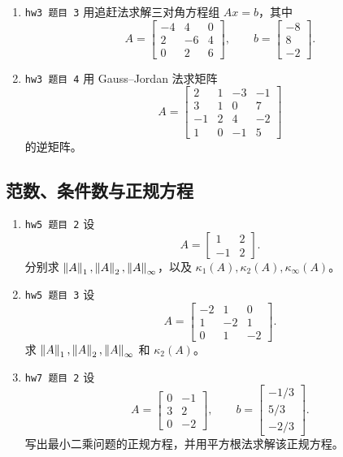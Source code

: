 \documentclass{article}
\begin{document}
\begin{enumerate}
  \item \texttt{hw3 题目 3} 用追赶法求解三对角方程组 $Ax=b$，其中
  \[
    A=
    \begin{bmatrix}
      -4&4&0\\
      2&-6&4\\
      0&2&6
    \end{bmatrix},\qquad
    b=\begin{bmatrix}-8\\8\\-2\end{bmatrix}.
  \]

  \item \texttt{hw3 题目 4} 用 Gauss--Jordan 法求矩阵
  \[
    A=
    \begin{bmatrix}
      2&1&-3&-1\\
      3&1&0&7\\
      -1&2&4&-2\\
      1&0&-1&5
    \end{bmatrix}
  \]
  的逆矩阵。
\end{enumerate}

\subsection{范数、条件数与正规方程}

\begin{enumerate}
  \item \texttt{hw5 题目 2} 设
  \[
    A=\begin{bmatrix}1&2\\-1&2\end{bmatrix}.
  \]
  分别求 $\left\| A \right\|_1,\left\| A \right\|_2,\left\| A \right\|_\infty$，以及
  $\kappa_1(A),\kappa_2(A),\kappa_\infty(A)$。

  \item \texttt{hw5 题目 3} 设
  \[
    A=
    \begin{bmatrix}
      -2&1&0\\
      1&-2&1\\
      0&1&-2
    \end{bmatrix}.
  \]
  求 $\left\| A \right\|_1,\left\| A \right\|_2,\left\| A \right\|_\infty$ 和 $\kappa_2(A)$。

  \item \texttt{hw7 题目 2} 设
  \[
    A=\begin{bmatrix}0&-1\\3&2\\0&-2\end{bmatrix},\qquad
    b=\begin{bmatrix}-1/3\\5/3\\-2/3\end{bmatrix}.
  \]
  写出最小二乘问题的正规方程，并用平方根法求解该正规方程。
\end{enumerate}
\end{document}
